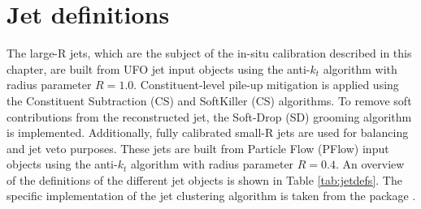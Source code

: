 \section{Jet definitions \label{sec:jetdef}}
The large-R jets, which are the subject of the in-situ calibration described in this chapter, are built from UFO jet input objects \cite{Atlas:UFO} using the anti-$k_t$ algorithm \cite{Insitu:antikt} with radius parameter $R=1.0$. Constituent-level pile-up mitigation is applied using the Constituent Subtraction (CS) \cite{Insitu:cs} and SoftKiller (CS) \cite{Insitu:sk} algorithms. To remove soft contributions from the reconstructed jet, the Soft-Drop (SD) grooming algorithm \cite{Insitu:softdrop} is implemented. Additionally, fully calibrated small-R jets \cite{Atlas:PFlow2,Insitu:smallrcali} are used for \pt balancing and jet veto purposes. These jets are built from Particle Flow (PFlow) \cite{Atlas:PFlow} input objects using the anti-$k_t$ algorithm with radius parameter $R=0.4$. An overview of the definitions of the different jet objects is shown in Table \ref{tab:jetdefs}. The specific implementation of the jet clustering algorithm is taken from the \FASTJET package \cite{Insitu:fastjet1,Insitu:fastjet2}.

